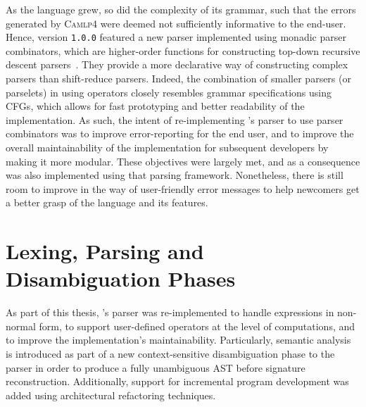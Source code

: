 As the \Beluga language grew, so did the complexity of its grammar, such that the errors generated by \textsc{Camlp4} were deemed not sufficiently informative to the end-user.
Hence, \Beluga version \texttt{1.0.0} featured a new parser implemented using monadic parser combinators, which are higher-order functions for constructing top-down recursive descent parsers~\cite{Burge1975-BURRPT, hutton1996monadic, leijen2001parsec, generalparsercombs}.
They provide a more declarative way of constructing complex parsers than shift-reduce parsers.
Indeed, the combination of smaller parsers (or parselets) in \OCaml using operators closely resembles grammar specifications using \acp{CFG}, which allows for fast prototyping and better readability of the implementation.
As such, the intent of re-implementing \Beluga's parser to use parser combinators was to improve error-reporting for the end user, and to improve the overall maintainability of the implementation for subsequent developers by making it more modular.
These objectives were largely met, and as a consequence \Harpoon was also implemented using that parsing framework.
Nonetheless, there is still room to improve in the way of user-friendly error messages to help newcomers get a better grasp of the language and its features.



\section{\Beluga Lexing, Parsing and Disambiguation Phases}\label{section:lexing-parsing-disambiguation}

As part of this thesis, \Beluga's parser was re-implemented to handle expressions in non-normal form, to support user-defined operators at the level of computations, and to improve the implementation's maintainability.
Particularly, semantic analysis is introduced as part of a new context-sensitive disambiguation phase to the parser in order to produce a fully unambiguous \ac{AST} before signature reconstruction.
Additionally, support for incremental program development was added using architectural refactoring techniques.

